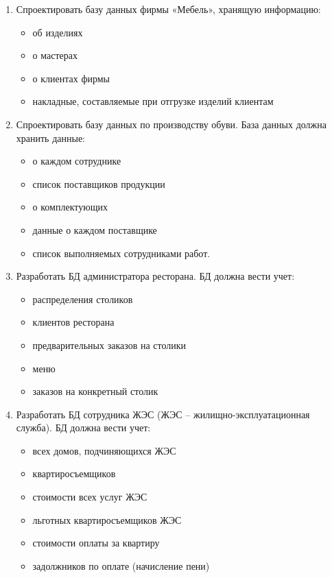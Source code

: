 \documentclass[a4paper]{article}
\begin{document}
\begin{enumerate}
  \item Спроектировать базу данных фирмы «Мебель», хранящую информацию:
    \begin{itemize}
        \item об изделиях
        \item о мастерах
        \item о клиентах фирмы
        \item накладные, составляемые при отгрузке изделий клиентам
    \end{itemize}


  \item Спроектировать базу данных по производству обуви. База данных должна хранить данные:
    \begin{itemize}
        \item о каждом сотруднике
        \item список поставщиков продукции
        \item о комплектующих
        \item данные о каждом поставщике
        \item список выполняемых сотрудниками работ.
    \end{itemize}


  \item Разработать БД администратора ресторана. БД должна вести учет:
    \begin{itemize}
        \item распределения столиков
        \item клиентов ресторана
        \item предварительных заказов на столики
        \item меню
        \item заказов на конкретный столик
    \end{itemize}

  \item Разработать БД сотрудника ЖЭС (ЖЭС – жилищно-эксплуатационная служба). БД должна вести учет:
    \begin{itemize}
        \item всех домов, подчиняющихся ЖЭС
        \item квартиросъемщиков
        \item стоимости всех услуг ЖЭС
        \item льготных квартиросъемщиков ЖЭС
        \item стоимости оплаты за квартиру
      \item задолжников по оплате (начисление пени)
    \end{itemize}


\end{enumerate}
\end{document}
